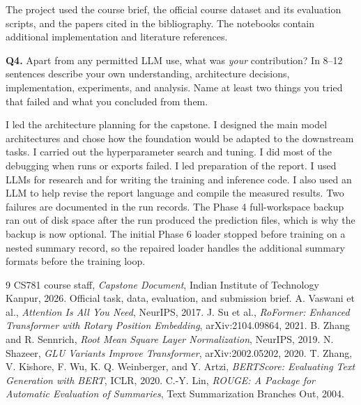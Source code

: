 \documentclass[11pt, oneside]{article}
\begin{document}
The project used the course brief, the official course dataset and its evaluation scripts, and the papers cited in the bibliography. The notebooks contain additional implementation and literature references.

\textbf{Q4.} Apart from any permitted LLM use, what was \emph{your} contribution? In 8--12 sentences describe your own understanding, architecture decisions, implementation, experiments, and analysis. Name at least two things you tried that failed and what you concluded from them.

I led the architecture planning for the capstone. I designed the main model architectures and chose how the foundation would be adapted to the downstream tasks. I carried out the hyperparameter search and tuning. I did most of the debugging when runs or exports failed. I led preparation of the report. I used LLMs for research and for writing the training and inference code. I also used an LLM to help revise the report language and compile the measured results. Two failures are documented in the run records. The Phase 4 full-workspace backup ran out of disk space after the run produced the prediction files, which is why the backup is now optional. The initial Phase 6 loader stopped before training on a nested summary record, so the repaired loader handles the additional summary formats before the training loop.


\clearpage
\begin{thebibliography}{9}
CS781 course staff, \textit{Capstone Document}, Indian Institute of Technology Kanpur, 2026. Official task, data, evaluation, and submission brief.
A. Vaswani et al., \emph{Attention Is All You Need}, NeurIPS, 2017.
J. Su et al., \emph{RoFormer: Enhanced Transformer with Rotary Position Embedding}, arXiv:2104.09864, 2021.
B. Zhang and R. Sennrich, \emph{Root Mean Square Layer Normalization}, NeurIPS, 2019.
N. Shazeer, \emph{GLU Variants Improve Transformer}, arXiv:2002.05202, 2020.
T. Zhang, V. Kishore, F. Wu, K. Q. Weinberger, and Y. Artzi, \emph{BERTScore: Evaluating Text Generation with BERT}, ICLR, 2020.
C.-Y. Lin, \emph{ROUGE: A Package for Automatic Evaluation of Summaries}, Text Summarization Branches Out, 2004.
\end{thebibliography}
\end{document}
